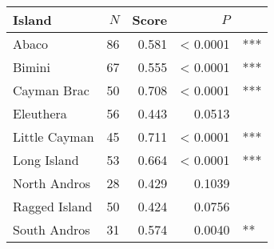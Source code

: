 
\begin{tabular}{lrrrl}
\toprule
Island & $N$ & Score & $P$ & \\
\midrule
Abaco & 86 & 0.581 & < 0.0001 & ***\\
Bimini & 67 & 0.555 & < 0.0001 & ***\\
Cayman Brac & 50 & 0.708 & < 0.0001 & ***\\
Eleuthera & 56 & 0.443 & 0.0513 & \\
Little Cayman & 45 & 0.711 & < 0.0001 & ***\\
Long Island & 53 & 0.664 & < 0.0001 & ***\\
North Andros & 28 & 0.429 & 0.1039 & \\
Ragged Island & 50 & 0.424 & 0.0756 & \\
South Andros & 31 & 0.574 & 0.0040 & **\\
\bottomrule
\end{tabular}